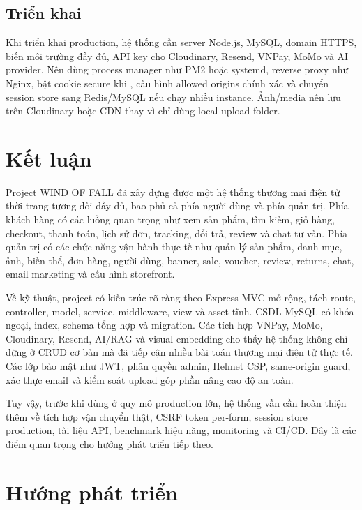 \documentclass[12pt,a4paper]{report}
\begin{document}
\section{Triển khai}

Khi triển khai production, hệ thống cần server Node.js, MySQL, domain HTTPS, biến môi trường đầy đủ, API key cho Cloudinary, Resend, VNPay, MoMo và AI provider. Nên dùng process manager như PM2 hoặc systemd, reverse proxy như Nginx, bật cookie secure khi , cấu hình allowed origins chính xác và chuyển session store sang Redis/MySQL nếu chạy nhiều instance. Ảnh/media nên lưu trên Cloudinary hoặc CDN thay vì chỉ dùng local upload folder.

\chapter*{Kết luận}

Project WIND OF FALL đã xây dựng được một hệ thống thương mại điện tử thời trang tương đối đầy đủ, bao phủ cả phía người dùng và phía quản trị. Phía khách hàng có các luồng quan trọng như xem sản phẩm, tìm kiếm, giỏ hàng, checkout, thanh toán, lịch sử đơn, tracking, đổi trả, review và chat tư vấn. Phía quản trị có các chức năng vận hành thực tế như quản lý sản phẩm, danh mục, ảnh, biến thể, đơn hàng, người dùng, banner, sale, voucher, review, returns, chat, email marketing và cấu hình storefront.

Về kỹ thuật, project có kiến trúc rõ ràng theo Express MVC mở rộng, tách route, controller, model, service, middleware, view và asset tĩnh. CSDL MySQL có khóa ngoại, index, schema tổng hợp và migration. Các tích hợp VNPay, MoMo, Cloudinary, Resend, AI/RAG và visual embedding cho thấy hệ thống không chỉ dừng ở CRUD cơ bản mà đã tiếp cận nhiều bài toán thương mại điện tử thực tế. Các lớp bảo mật như JWT, phân quyền admin, Helmet CSP, same-origin guard, xác thực email và kiểm soát upload góp phần nâng cao độ an toàn.

Tuy vậy, trước khi dùng ở quy mô production lớn, hệ thống vẫn cần hoàn thiện thêm về tích hợp vận chuyển thật, CSRF token per-form, session store production, tài liệu API, benchmark hiệu năng, monitoring và CI/CD. Đây là các điểm quan trọng cho hướng phát triển tiếp theo.

\chapter*{Hướng phát triển}
\end{document}
